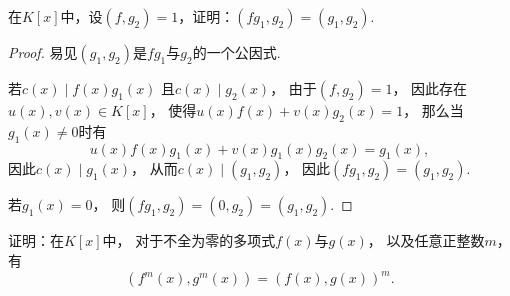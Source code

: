\begin{example}
在\(K[x]\)中，设\((f,g_2)=1\)，证明：\((fg_1,g_2)=(g_1,g_2)\).
\begin{proof}
易见\((g_1,g_2)\)是\(fg_1\)与\(g_2\)的一个公因式.

若\(c(x) \mid f(x) g_1(x)\)
且\(c(x) \mid g_2(x)\)，
由于\((f,g_2)=1\)，
因此存在\(u(x),v(x) \in K[x]\)，
使得\(u(x) f(x) + v(x) g_2(x) = 1\)，
那么当\(g_1(x)\neq0\)时有\[
	u(x) f(x) g_1(x) + v(x) g_1(x) g_2(x) = g_1(x),
\]
因此\(c(x) \mid g_1(x)\)，
从而\(c(x) \mid (g_1,g_2)\)，
因此\((fg_1,g_2)=(g_1,g_2)\).

若\(g_1(x)=0\)，
则\((fg_1,g_2)=(0,g_2)=(g_1,g_2)\).
\end{proof}
\end{example}

\begin{example}
证明：在\(K[x]\)中，
对于不全为零的多项式\(f(x)\)与\(g(x)\)，
以及任意正整数\(m\)，
有\[
	(f^m(x),g^m(x))=(f(x),g(x))^m.
\]
\end{example}
